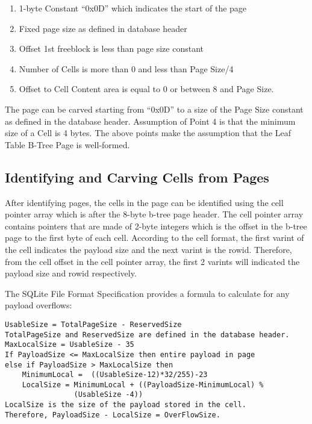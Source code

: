 \documentclass{article}
\begin{document}
\begin{enumerate}
\item 1-byte Constant ``0x0D'' which indicates the start of the page
\item Fixed page size as defined in database header
\item Offset 1st freeblock is less than page size constant
\item Number of Cells is more than 0 and less than Page Size/4
\item Offset to Cell Content area is equal to 0 or between 8 and Page Size.
\end{enumerate}

The page can be carved starting from ``0x0D'' to a size of the Page Size constant as defined in the database header. Assumption of Point 4 is that the minimum size of a Cell is 4 bytes. The above points make the assumption that the Leaf Table B-Tree Page is well-formed.

\subsection{Identifying and Carving Cells from Pages}

After identifying pages, the cells in the page can be identified using the cell pointer array which is after the 8-byte b-tree page header. The cell pointer array contains pointers that are made of 2-byte integers which is the offset in the b-tree page to the first byte of each cell.
According to the cell format, the first varint of the cell indicates the payload size and the next varint is the rowid. Therefore, from the cell offset in the cell pointer array, the first 2 varints will indicated the payload size and rowid respectively. 

The SQLite File Format Specification provides a formula to calculate for any payload overflows:

\begin{verbatim}
UsableSize = TotalPageSize - ReservedSize
TotalPageSize and ReservedSize are defined in the database header.
MaxLocalSize = UsableSize - 35
If PayloadSize <= MaxLocalSize then entire payload in page
else if PayloadSize > MaxLocalSize then
    MinimumLocal =  ((UsableSize-12)*32/255)-23
    LocalSize = MinimumLocal + ((PayloadSize-MinimumLocal) % 
                (UsableSize -4))
LocalSize is the size of the payload stored in the cell. 
Therefore, PayloadSize - LocalSize = OverFlowSize.
\end{verbatim}
\end{document}
